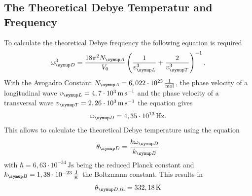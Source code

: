 \subsection{The Theoretical Debye Temperatur and Frequency}

To calculate the theoretical Debye frequency the following equation is 
required
\begin{equation*}
    \omega\idx{D}^3 = \frac{18 \pi^2 N\idx{A}}{V_0} \left (\frac{1}{v\idx{L}^3} + \frac{2}{v\idx{T}^3} \right )^{-1}.
\end{equation*}
With the Avogadro Constant $N\idx{A}= 6,022 \cdot 10^{23}\,\unit{\frac{1}{\mole}}$\cite{wiki}, 
the phase velocity of a longitudinal wave $v\idx{L}= 4,7 \cdot 10^3\,\unit{\meter\per\second}$\cite{V47}
and the phase velocity of a transversal wave $v\idx{T}= 2,26 \cdot 10^3\,\unit{\meter\per\second}$\cite{V47}
the equation gives
\begin{equation*}
    \omega\idx{D} = 4,35 \cdot 10^{13}\,\unit{\hertz}.
\end{equation*}
This allows to calculate the theoretical Debye temperature using the equation
\begin{equation*}
    \theta\idx{D}= \frac{\hbar \omega\idx{D}}{k\idx{B}}
\end{equation*}
with $\hbar= 6,63 \cdot 10^{-34}\,\unit{\joule\second}$ \cite{wiki_const} being the reduced Planck constant 
and $k\idx{B}= 1,38 \cdot 10^{-23}\,\unit{\frac{\joule}{\kelvin}}$ \cite{wiki_const} the Boltzmann constant.
This results in 
\begin{equation*}
    \theta\idx{D,th} = 332,18\,\unit{\kelvin}
\end{equation*}